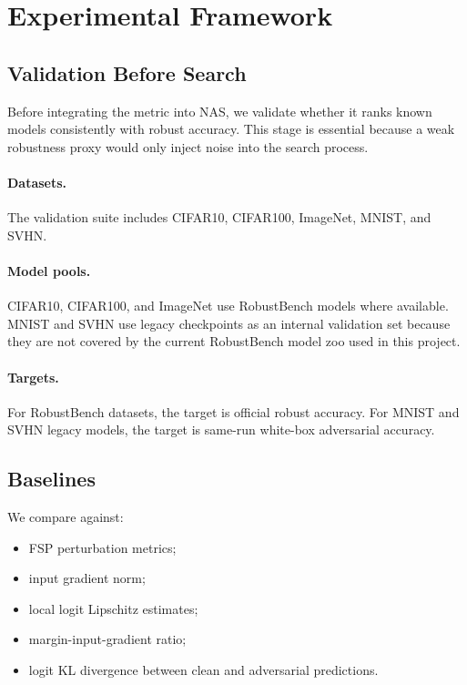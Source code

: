 \documentclass[10pt,twocolumn]{article}
\begin{document}
\section{Experimental Framework}

\subsection{Validation Before Search}

Before integrating the metric into NAS, we validate whether it ranks known models consistently with robust accuracy.
This stage is essential because a weak robustness proxy would only inject noise into the search process.

\paragraph{Datasets.}
The validation suite includes CIFAR10, CIFAR100, ImageNet, MNIST, and SVHN.

\paragraph{Model pools.}
CIFAR10, CIFAR100, and ImageNet use RobustBench models where available.
MNIST and SVHN use legacy checkpoints as an internal validation set because they are not covered by the current RobustBench model zoo used in this project.

\paragraph{Targets.}
For RobustBench datasets, the target is official robust accuracy.
For MNIST and SVHN legacy models, the target is same-run white-box adversarial accuracy.

\subsection{Baselines}

We compare against:
\begin{itemize}
  \item FSP perturbation metrics;
  \item input gradient norm;
  \item local logit Lipschitz estimates;
  \item margin-input-gradient ratio;
  \item logit KL divergence between clean and adversarial predictions.
\end{itemize}
\end{document}
